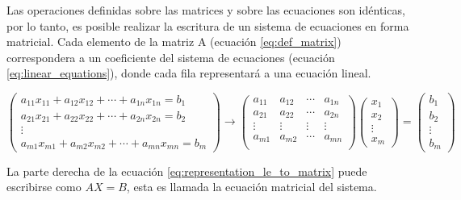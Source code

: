 Las operaciones definidas sobre las matrices y sobre las ecuaciones son idénticas, por lo tanto, es posible realizar la escritura de un sistema de ecuaciones en forma matricial. Cada elemento de la matriz A (ecuación \ref{eq:def_matrix}) correspondera a un coeficiente del sistema de ecuaciones (ecuación \ref{eq:linear_equations}), donde cada fila representará a una ecuación lineal.

\begin{equation}
    \begin{pmatrix}
        a_{11}x_{11}+a_{12}x_{12}+\cdots + a_{1n}x_{1n} = b_{1} \\
        a_{21}x_{21}+a_{22}x_{22}+\cdots + a_{2n}x_{2n} = b_{2} \\
        \vdots                                                  \\
        a_{m1}x_{m1}+a_{m2}x_{m2}+\cdots + a_{mn}x_{mn} = b_{m}
    \end{pmatrix} \rightarrow
    \begin{pmatrix}
        a_{11} & a_{12} & \cdots & a_{1n} \\
        a_{21} & a_{22} & \cdots & a_{2n} \\
        \vdots & \vdots & \vdots & \vdots \\
        a_{m1} & a_{m2} & \cdots & a_{mn} \\
    \end{pmatrix}
    \begin{pmatrix}
        x_1    \\
        x_2    \\
        \vdots \\
        x_m
    \end{pmatrix} =
    \begin{pmatrix}
        b_1    \\
        b_2    \\
        \vdots \\
        b_m
    \end{pmatrix}
    \label{eq:representation_le_to_matrix}
\end{equation}

La parte derecha de la ecuación \ref{eq:representation_le_to_matrix} puede escribirse como $AX=B$, esta es llamada la ecuación matricial del sistema.
